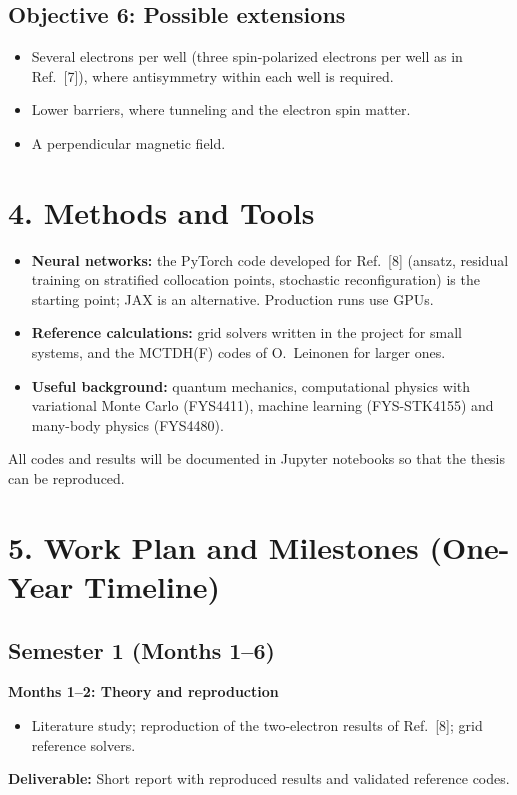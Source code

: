 \documentclass[12pt,a4paper]{article}
\begin{document}
\subsection*{Objective 6: Possible extensions}
\begin{itemize}
  \item Several electrons per well (three spin-polarized electrons per
  well as in Ref.~[7]), where antisymmetry within each well is
  required.
  \item Lower barriers, where tunneling and the electron spin matter.
  \item A perpendicular magnetic field.
\end{itemize}

\section*{4. Methods and Tools}

\begin{itemize}
  \item \textbf{Neural networks:} the PyTorch code developed for
  Ref.~[8] (ansatz, residual training on stratified collocation
  points, stochastic reconfiguration) is the starting point; JAX is
  an alternative.  Production runs use GPUs.
  \item \textbf{Reference calculations:} grid solvers written in the
  project for small systems, and the MCTDH(F) codes of O.~Leinonen for
  larger ones.
  \item \textbf{Useful background:} quantum mechanics, computational
  physics with variational Monte Carlo (FYS4411), machine learning
  (FYS-STK4155) and many-body physics (FYS4480).
\end{itemize}
All codes and results will be documented in Jupyter notebooks so that
the thesis can be reproduced.

\section*{5. Work Plan and Milestones (One-Year Timeline)}

\subsection*{Semester 1 (Months 1--6)}

\textbf{Months 1--2: Theory and reproduction}
\begin{itemize}
    \item Literature study; reproduction of the two-electron results
    of Ref.~[8]; grid reference solvers.
\end{itemize}
\textbf{Deliverable:} Short report with reproduced results and
validated reference codes.
\end{document}
